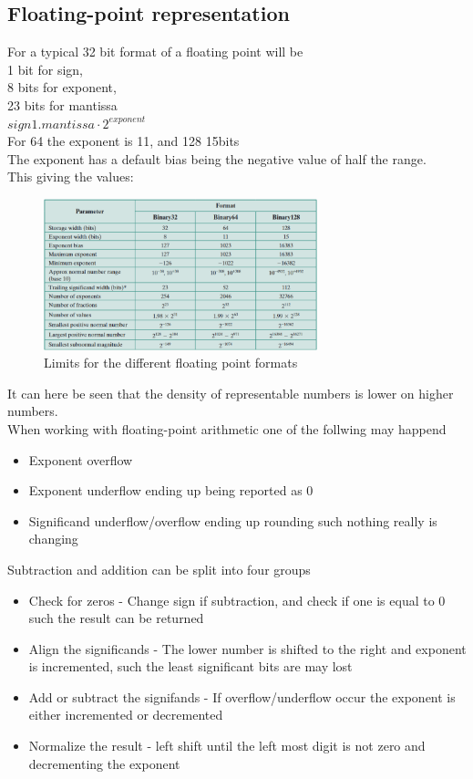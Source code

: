\documentclass[12pt, a4paper]{article}
\begin{document}
		\subsection{Floating-point representation}
			For a typical 32 bit format of a floating point will be\\
			1 bit for sign,\\
			8 bits for exponent,\\
			23 bits for mantissa\\
			$sign 1.mantissa\cdot 2^{exponent}$\\
			For 64 the exponent is 11, and 128 15bits\\
			The exponent has a default bias being the negative value of half the range.\\
			This giving the values:
			\begin{figure}[h!]
				\includegraphics[width=300px]{assets/floatingPointLimits.png}
				\caption{Limits for the different floating point formats}
				\centering
			\end{figure}
			It can here be seen that the density of representable numbers is lower on higher numbers.\\
			When working with floating-point arithmetic one of the follwing may happend
			\begin{itemize}
				\item Exponent overflow
				\item Exponent underflow ending up being reported as 0
				\item Significand underflow/overflow ending up rounding such nothing really is changing
			\end{itemize}
			Subtraction and addition can be split into four groups
			\begin{itemize}
				\item Check for zeros - Change sign if subtraction, and check if one is equal to 0 such the result can be returned
				\item Align the significands - The lower number is shifted to the right and exponent is incremented, such the least significant bits are may lost
				\item Add or subtract the signifands - If overflow/underflow occur the exponent is either incremented or decremented
				\item Normalize the result - left shift until the left most digit is not zero and decrementing the exponent
			\end{itemize}
\end{document}
